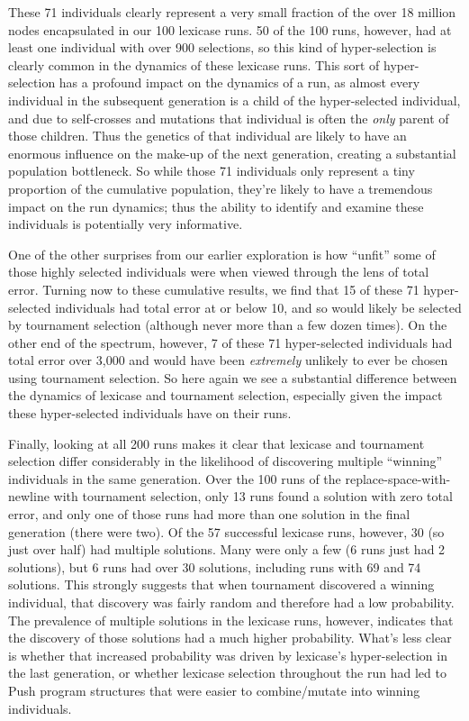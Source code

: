 These 71 individuals clearly represent a very small fraction of the over 18 million nodes encapsulated in our 100 lexicase
runs. 50 of
the 100 runs, however, had at least one individual with over 900 selections, so this kind of 
hyper-selection is clearly common in the dynamics of these lexicase runs. This sort of hyper-selection 
has a profound impact on the dynamics of a run, as almost every individual in the subsequent generation is a child of
the hyper-selected individual, and due to self-crosses and mutations that individual is often the \emph{only} parent of those children. Thus
the genetics of that individual are likely to have an enormous influence on the make-up of the next generation, creating
a substantial population bottleneck. So while those 71 individuals only represent a tiny proportion of
the cumulative population, they're likely to have a tremendous impact on the run dynamics; thus the ability to identify and
examine these individuals is potentially very informative.

One of the other surprises from our earlier exploration is how ``unfit'' some of those highly selected individuals were when
viewed through the lens of total error. Turning now to these cumulative results, we find that 15 of these 71 hyper-selected
individuals had total error at or below 10, and so would likely be selected by tournament selection (although never more 
than a few dozen times). On the other end of the spectrum, however, 7 of these 71 hyper-selected individuals had total 
error over 3,000 and would have been \emph{extremely} unlikely to ever be chosen using tournament selection. So here
again we see a substantial difference between the dynamics of lexicase and tournament selection, especially given the
impact these hyper-selected individuals have on their runs.

Finally, looking at all 200 runs makes it clear that lexicase and tournament selection differ considerably in the 
likelihood of discovering multiple ``winning'' individuals in the same generation. Over the 100 runs of the 
replace-space-with-newline with tournament selection, only 13 runs found a solution with zero total error, and only one
of those runs had more than one solution in the final generation (there were two). Of the 57 successful lexicase runs, 
however, 30 (so just over half) had multiple solutions. Many were only a few (6 runs just had 2 solutions), but 6 runs had
over 30 solutions, including runs with 69 and 74 solutions. This strongly suggests that when tournament discovered a
winning individual, that discovery was fairly random and therefore had a low probability. The prevalence of multiple
solutions in the lexicase runs, however, indicates that the discovery of those solutions had a much higher probability.
What's less clear is whether that increased probability was driven by lexicase's hyper-selection in the last generation,
or whether lexicase selection throughout the run had led to Push program structures that were easier to combine/mutate
into winning individuals.

